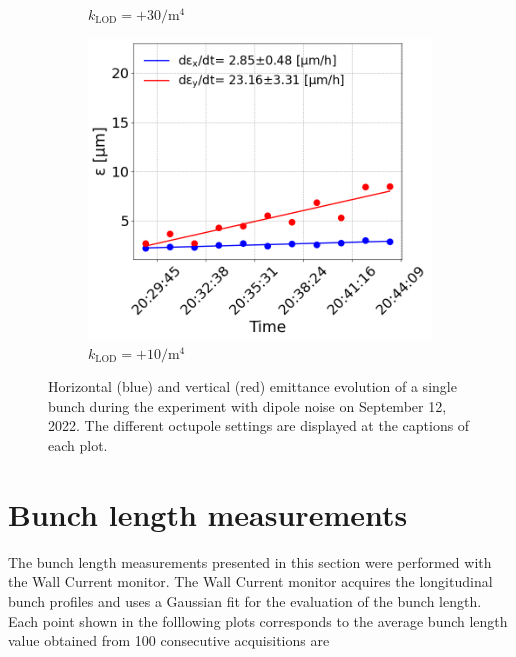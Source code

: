 \begin{figure}[htp]
\begin{subfigure}{.45\textwidth}
            \caption{$k_\mathrm{LOD}=+30  \mathrm{/m^{4}}$}
    \end{subfigure}
    \begin{subfigure}{.45\textwidth}
        \centering
        \includegraphics[width=.95\linewidth]{images/app_c/cc_md_12sep22_coast11.png}  
        \caption{$k_\mathrm{LOD}=+10 \mathrm{/m^{4}}$}
    \end{subfigure}
    \caption{Horizontal (blue) and vertical (red) emittance evolution of a single bunch during the experiment with dipole noise on September 12, 2022.  The different octupole settings are displayed at the captions of each plot.}
    \label{fig:cc_md_12sep2022_overview_plots_klod_scan}
 \end{figure}
 
 

 \section{Bunch length measurements}\label{sec:bunch_length_meas_2022}



 The bunch length measurements presented in this section were performed with the Wall Current monitor. The Wall Current monitor acquires the longitudinal bunch profiles and uses a Gaussian fit for the evaluation of the bunch length. Each point shown in the folllowing plots corresponds to the average bunch length value obtained from 100 consecutive acquisitions are  



